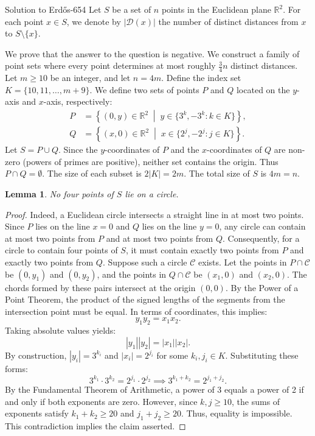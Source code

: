 \documentclass{article}
\theoremstyle{plain}
\newtheorem{lemma}{Lemma}
\theoremstyle{definition}
\begin{document}
\begin{solution}{Solution to {Erdős-654}}
Let $S$ be a set of $n$ points in the Euclidean plane $\mathbb{R}^2$. For each point $x \in S$, we denote by $|\mathcal{D}(x)|$ the number of distinct distances from $x$ to $S \setminus \{x\}$.

We prove that the answer to the question is negative. We construct a family of point sets where every point determines at most roughly $\frac{3}{4}n$ distinct distances. Let $m \ge 10$ be an integer, and let $n = 4m$. Define the index set $K = \{10, 11, \dots, m+9\}$.
We define two sets of points $P$ and $Q$ located on the $y$-axis and $x$-axis, respectively:
\begin{align*}
P &= \left\{ (0, y) \in \mathbb{R}^2 \;\middle|\; y \in \{ 3^k, -3^k : k \in K \} \right\},
\\
Q &= \left\{ (x, 0) \in \mathbb{R}^2 \;\middle|\; x \in \{ 2^j, -2^j : j \in K \} \right\}.
\end{align*}
Let $S = P \cup Q$.
Since the $y$-coordinates of $P$ and the $x$-coordinates of $Q$ are non-zero (powers of primes are positive), neither set contains the origin. Thus $P \cap Q = \emptyset$.
The size of each subset is $2|K| = 2m$. The total size of $S$ is $4m = n$.

\begin{lemma}
No four points of $S$ lie on a circle. \end{lemma}
\begin{proof}
Indeed, a Euclidean circle intersects a straight line in at most two points. Since $P$ lies on the line $x=0$ and $Q$ lies on the line $y=0$, any circle can contain at most two points from $P$ and at most two points from $Q$.
Consequently, for a circle to contain four points of $S$, it must contain exactly two points from $P$ and exactly two points from $Q$.
Suppose such a circle $\mathcal{C}$ exists. Let the points in $P \cap \mathcal{C}$ be $(0, y_1)$ and $(0, y_2)$, and the points in $Q \cap \mathcal{C}$ be $(x_1, 0)$ and $(x_2, 0)$.
The chords formed by these pairs intersect at the origin $(0,0)$. By the Power of a Point Theorem, the product of the signed lengths of the segments from the intersection point must be equal. In terms of coordinates, this implies:
\[
y_1 y_2 = x_1 x_2.
\]
Taking absolute values yields:
\[
|y_1| |y_2| = |x_1| |x_2|.
\]
By construction, $|y_i| = 3^{k_i}$ and $|x_i| = 2^{j_i}$ for some $k_i, j_i \in K$. Substituting these forms:
\[
3^{k_1} \cdot 3^{k_2} = 2^{j_1} \cdot 2^{j_2} \implies 3^{k_1 + k_2} = 2^{j_1 + j_2}.
\]
By the Fundamental Theorem of Arithmetic, a power of 3 equals a power of 2 if and only if both exponents are zero. However, since $k, j \ge 10$, the sums of exponents satisfy $k_1+k_2 \ge 20$ and $j_1+j_2 \ge 20$. Thus, equality is impossible.
This contradiction implies the claim asserted.
\end{proof}


\end{solution}
\end{document}

